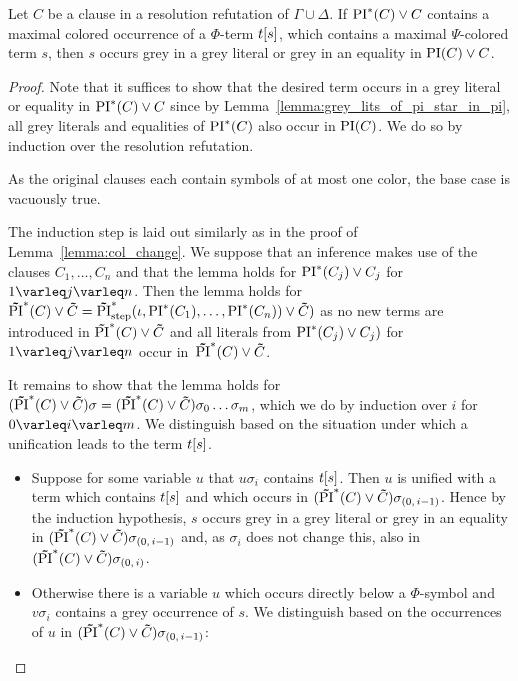\documentclass[%
	draft=false,%
	numbers=noendperiod,%
	11pt,%
	a4paper,%
	oneside,%
	openany,%
]{memoir}
\begin{document}
\begin{lemma}
	\label{lemma:subterm_in_grey_lit}
	Let $C$ be a clause in a resolution refutation of $\Gamma \cup \Delta$.
	If $\operatorname{PI}^*(C) \lor C$ contains a maximal colored occurrence of a $\Phi$-term $t[s]$, which contains a maximal $\Psi$-colored term $s$, then $s$ occurs grey in a grey literal or grey in an equality in $\operatorname{PI}(C) \lor C$.
\end{lemma}
\begin{proof}
	Note that it suffices to show that the desired term occurs in a grey literal or equality in $\operatorname{PI}^*(C) \lor C$
	since by Lemma~\ref{lemma:grey_lits_of_pi_star_in_pi}, all grey literals and equalities of $\operatorname{PI}^*(C)$ also occur in $\operatorname{PI}(C)$.
	We do so by induction over the resolution refutation.
	
	As the original clauses each contain symbols of at most one color, the base case is vacuously true.

	The induction step is laid out similarly as in the proof of Lemma~\ref{lemma:col_change}. 
	We suppose that an inference makes use of the clauses $C_1, \dots, C_n$ and that the lemma holds for $\operatorname{PI}^*(C_j) \lor C_j$ for $1\varleq j \varleq n$. 
	Then the lemma holds for $\bm\tilde{\operatorname{PI}}^{*}(C)\lor \bm\tilde{C} = \bm\tilde{\operatorname{PI}}^{*}_{\mathrm{step}}(\iota, \operatorname{PI}^*(C_1), \dots, \operatorname{PI}^*(C_n)) \lor \bm\tilde{C})$ as no new terms are introduced in $\bm\tilde{\operatorname{PI}}^{*}(C)\lor \bm\tilde{C}$ and all literals from $\operatorname{PI}^*(C_j) \lor C_j)$ for $1\varleq j \varleq n$ occur in~$\bm\tilde{\operatorname{PI}}^{*}(C)\lor \bm\tilde{C}$.

	It remains to show that the lemma holds for $(\bm\tilde{\operatorname{PI}}^{*}(C)\lor \bm\tilde{C})\sigma = (\bm\tilde{\operatorname{PI}}^{*}(C)\lor \bm\tilde{C})\sigma_0 \dots \sigma_m$, which we do by induction over $i$ for $0 \varleq i \varleq m$.
	We distinguish based on the situation under which a unification leads to the term $t[s]$.

	\begin{itemize}
		\item 
			Suppose for some variable $u$ that $u\sigma_i$ contains $t[s]$. 
			Then $u$ is unified with a term which contains $t[s]$ and which occurs in $(\bm\tilde{\operatorname{PI}}^{*}(C)\lor \bm\tilde{C})\sigma_{(0,\,i-1)}$.
			Hence by the induction hypothesis, $s$ occurs grey in a grey literal or grey in an equality in $(\bm\tilde{\operatorname{PI}}^{*}(C)\lor \bm\tilde{C})\sigma_{(0,\,i-1)}$ and, as $\sigma_i$ does not change this, also in $(\bm\tilde{\operatorname{PI}}^{*}(C)\lor \bm\tilde{C})\sigma_{(0,\,i)}$.

		\item 
			Otherwise there is a variable $u$ which occurs directly below a $\Phi$-symbol and $v\sigma_i$ contains a grey occurrence of $s$.
			We distinguish based on the occurrences of $u$ in $(\bm\tilde{\operatorname{PI}}^{*}(C)\lor \bm\tilde{C})\sigma_{(0,\,i-1)}$:


\end{itemize}
\end{proof}
\end{document}
